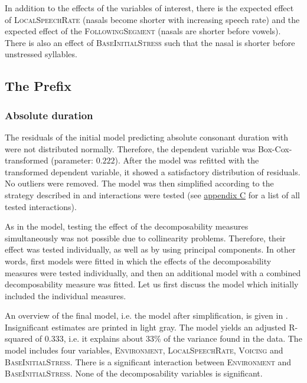 In addition to the effects of the variables of interest, there is the expected effect of \textsc{LocalSpeechRate} (nasals become shorter with increasing speech rate) and the expected effect of the \textsc{FollowingSegment} (nasals are shorter before vowels). There is also an effect of \textsc{BaseInitialStress} such that the nasal is shorter before unstressed syllables.

\subsection{The Prefix } \label{corpus results dis}


\subsubsection{Absolute duration}

The residuals of the initial model predicting absolute consonant duration with  were not distributed normally. Therefore, the dependent variable was Box-Cox-transformed (parameter:  $0.222$). After the model was refitted with the transformed dependent variable, it showed a satisfactory distribution of residuals. No outliers were removed. The model was then simplified according to the strategy described in   and interactions were tested (see \hyperref[Appendix C: Summaries of tested interactions in corpus study]{appendix C} for a list of all tested interactions).

As in the model, testing the effect of the decomposability measures simultaneously was not possible due to collinearity problems. Therefore, their effect was tested individually, as well as by using principal components. In other words, first models were fitted in which the effects of the decomposability measures were tested individually, and then an additional model with a combined decomposability measure was fitted. 
 Let us first discuss the model which initially included the individual measures.

An overview of the final model, i.e. the model after simplification, is given in . Insignificant estimates are printed in light gray. The model yields an adjusted R-squared of  0.333, i.e. it explains about 33\% of the variance found in the data. The model includes four variables, \textsc{Environment}, \textsc{LocalSpeechRate}, \textsc{Voicing} and \textsc{BaseInitialStress}. There is a significant interaction between \textsc{Environment} and \textsc{BaseInitialStress}. None of the decomposability variables is significant.


